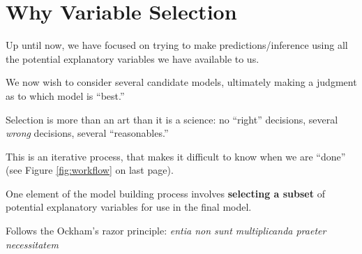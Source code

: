 \documentclass[12pt]{notes}
\begin{document}

\section{Why Variable Selection}
\bi
\item Up until now, we have focused on trying to make predictions/inference using all the potential explanatory variables we have available to us. 
\item We now wish to consider several candidate models, ultimately making a judgment as to which model is ``best.''
\bi
\item Selection is more than an art than it is a science: no ``right'' decisions, several \textit{wrong} decisions, several ``reasonables.''
\item This is an iterative process, that makes it difficult to know when we are ``done'' (see Figure \ref{fig:workflow} on last page). 
\ei
\item One element of the model building process involves \textbf{selecting a subset} of potential explanatory variables for use in the final model. 
\bi
\item Follows the Ockham's razor principle:  \emph{entia non sunt multiplicanda praeter necessitatem}
\ei
\begin{minipage}[l][2cm][c]{\textwidth}

\end{minipage}
\ei




\begin{minipage}[l][4cm][c]{\textwidth}

\end{minipage}

\end{document}
